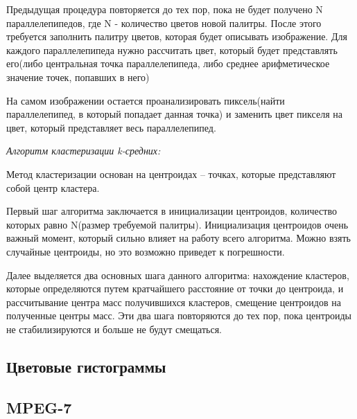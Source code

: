 Предыдущая процедура повторяется до тех пор, пока не будет получено N параллелепипедов, где N - количество цветов новой палитры. После этого требуется заполнить палитру цветов, которая будет описывать изображение. Для каждого параллелепипеда нужно рассчитать цвет, который будет представлять его(либо центральная точка параллелепипеда, либо среднее арифметическое значение точек, попавших в него)

На самом изображении остается проанализировать пиксель(найти параллелепипед, в который попадает данная точка) и заменить цвет пикселя на цвет, который представляет весь параллелепипед.

\textit{Алгоритм кластеризации k-средних:}

Метод кластеризации основан на центроидах -- точках, которые представляют собой центр кластера.

Первый шаг алгоритма заключается в инициализации центроидов, количество которых равно N(размер требуемой палитры). Инициализация центроидов очень важный момент, который сильно влияет на работу всего алгоритма. Можно взять случайные центроиды, но это возможно приведет к погрешности.

Далее выделяется два основных шага данного алгоритма: нахождение кластеров, которые определяются путем кратчайшего расстояние от точки до центроида, и рассчитывание центра масс получившихся кластеров, смещение центроидов на полученные центры масс. Эти два шага повторяются до тех пор, пока центроиды не стабилизируются и больше не будут смещаться.

\begin{figure}[ht!]
\end{figure}

\subsection{ Цветовые гистограммы}
\subsection{ MPEG-7}
